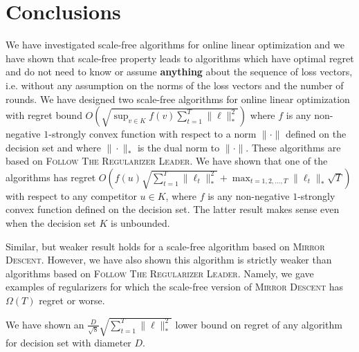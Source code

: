 \section{Conclusions}
\label{section:conclusions}

We have investigated scale-free algorithms for online linear optimization and
we have shown that scale-free property leads to algorithms which have optimal
regret and do not need to know or assume \textbf{anything} about the sequence
of loss vectors, i.e. without any assumption on the norms of the loss vectors
and the number of rounds. We have designed two scale-free algorithms for online
linear optimization with regret bound $O \left(\sqrt{\sup_{v \in K} f(v)
\sum_{t=1}^T \|\ell\|_*^2} \right)$ where $f$ is any non-negative $1$-strongly
convex function with respect to a norm $\|\cdot\|$ defined on the decision set
and where $\|\cdot\|_*$ is the dual norm to $\|\cdot\|$.  These algorithms are
based on \textsc{Follow The Regularizer Leader}.  We have shown that one of the
algorithms has regret $O \left(f(u) \sqrt{\sum_{t=1}^T \|\ell_t\|_*^2} +
\max_{t=1,2,\dots,T} \|\ell_t\|_* \sqrt{T} \right)$ with respect to any
competitor $u \in K$, where $f$ is any non-negative $1$-strongly convex
function defined on the decision set.  The latter result makes sense even when
the decision set $K$ is unbounded.

Similar, but weaker result holds for a scale-free algorithm based on
\textsc{Mirror Descent}. However, we have also shown this algorithm is strictly
weaker than algorithms based on \textsc{Follow The Regularizer Leader}. Namely,
we gave examples of regularizers for which the scale-free version of
\textsc{Mirror Descent} has $\Omega(T)$ regret or worse.

We have shown an $\frac{D}{\sqrt{8}} \sqrt{\sum_{t=1}^T \|\ell\|_*^2}$
lower bound on regret of any algorithm for decision set with diameter $D$.
